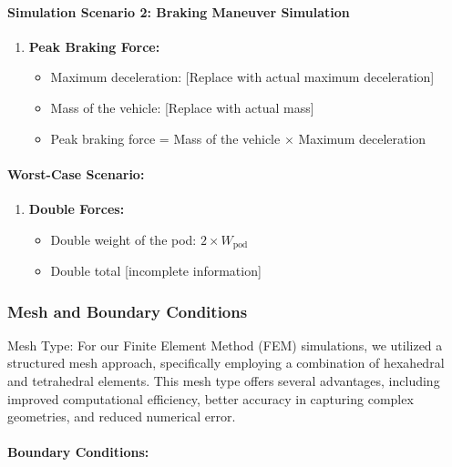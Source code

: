 \paragraph{Simulation Scenario 2: Braking Maneuver Simulation}

\begin{enumerate}
  \item \textbf{Peak Braking Force:}
  \begin{itemize}
    \item Maximum deceleration: [Replace with actual maximum deceleration]
    \item Mass of the vehicle: [Replace with actual mass]
    \item Peak braking force = Mass of the vehicle \(\times\) Maximum deceleration
  \end{itemize}
\end{enumerate}

\paragraph{Worst-Case Scenario:}

\begin{enumerate}
  \item \textbf{Double Forces:}
  \begin{itemize}
    \item Double weight of the pod: \(2 \times W_{\text{pod}}\)
    \item Double total [incomplete information]
  \end{itemize}
\end{enumerate}


\subsubsection{Mesh and Boundary Conditions}

Mesh Type: For our Finite Element Method (FEM) simulations, we utilized a structured mesh approach, specifically employing a combination of hexahedral and tetrahedral elements. This mesh type offers several advantages, including improved computational efficiency, better accuracy in capturing complex geometries, and reduced numerical error.
\paragraph{Boundary Conditions:}

